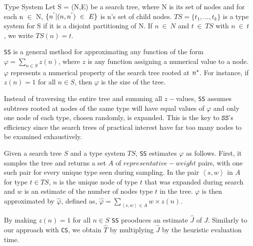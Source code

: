 \begin{definition}{Type System}
Let S = (N,E) be a search tree, where N is its set of nodes and  for each n $\in$ N, $\{n\sp{'}|(n,n\sp{'})\ \in\ E \}$ is n's set of child nodes. $TS = \{t_{1},...,t_{k} \}$ is a type system for S if it is a disjoint partitioning of N. If $n\ \in\ N$ and $t\ \in\ TS$ with $n\ \in\ t$, we write $TS(n) = t$.
\end{definition}

\texttt{SS} is a general method for approximating any function of the form $\varphi = \sum_{n \in S}z(n)$, where $z$ is any function assigning a numerical value to a node.  $\varphi$ represents a numerical property of the search tree rooted at $n\sp{*}$. For instance, if $z(n)=1$ for all $n \in S$, then $\varphi$ is the size of the tree.

Instead of traversing the entire tree and summing all $z-$values, \texttt{SS} assumes subtrees rooted at nodes of the same type will have equal values of $\varphi$ and only one node of each type, chosen randomly, is expanded. This is the key to $\texttt{SS}$'s efficiency since the search trees of practical interest have far too many nodes to be examined exhaustively.

Given a search tree $S$ and a type system $TS$, \texttt{SS} estimates $\varphi$ as follows. First, it samples the tree and returns a set $A$ of $representative-weight$ pairs, with one such pair for every unique type seen during sampling. In the pair $\left\langle s,w \right\rangle$ in $A$ for type $t \in TS$, $n$ is the unique node of type $t$ that was expanded during search and $w$ is an estimate of the number of nodes type $t$ in the tree. $\varphi$ is then approximated by $\hat{\varphi}$, defined as, $\hat{\varphi} =  \sum_{\left\langle s,w \right\rangle \in A}w \times z(n)$.

By making $z(n) = 1$ for all $n \in S$ \texttt{SS} prooduces an estimate $\hat{J}$ of $J$. Similarly to our approach with \texttt{CS}, we obtain $\hat{T}$ by multiplying $\hat{J}$ by the heuristic evaluation time.


